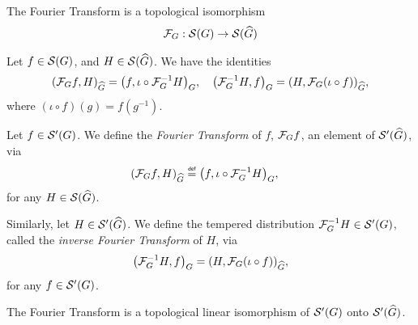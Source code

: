 \begin{theorem}
    The Fourier Transform is a topological isomorphism
    \begin{align*}
        \Fourier : \Schwartz \Group \to \Schwartz {\dualGroup \Group}
    \end{align*}
\end{theorem}

\begin{proposition}
    Let $f \in \Schwartz\Group$, and $H \in \Schwartz{\dualGroup\Group}$.
    We have the identities
    \begin{align*}
        \ip[\dualGroup\Group]{\Fourier f}{H}
        = \ip[\Group]{f}{\iota \circ \InverseFourier H},\quad
        \ip[\Group]{\InverseFourier H}{f}
        = \ip[\dualGroup\Group]{H}{\Fourier (\iota \circ f)},
    \end{align*}
    where $(\iota \circ f)(g) = f(g^{-1})$.
\end{proposition}

\begin{definition}
    Let $f \in \TemperedDistributions\Group$.
    We define the \emph{Fourier Transform} of $f$, $\Fourier f$,
    an element of $\TemperedDistributions{\dualGroup\Group}$, via
    \begin{align*}
        \ip[\dualGroup\Group]{\Fourier f}{H}
        \defeq \ip[\Group]{f}{\iota \circ \InverseFourier H},\quad
    \end{align*}
    for any $H \in \Schwartz{\dualGroup\Group}$.

    Similarly, let $H \in \TemperedDistributions{\dualGroup\Group}$.
    We define the tempered distribution $\InverseFourier H \in \TemperedDistributions\Group$,
    called the \emph{inverse Fourier Transform} of $H$, via
    \begin{align*}
        \ip[\Group]{\InverseFourier H}{f}
        = \ip[\dualGroup\Group]{H}{\Fourier (\iota \circ f)},
    \end{align*}
    for any $f \in \TemperedDistributions\Group$.
\end{definition}

\begin{proposition}
    The Fourier Transform is a topological linear isomorphism
    of $\TemperedDistributions\Group$ onto $\TemperedDistributions{\dualGroup\Group}$.
\end{proposition}


